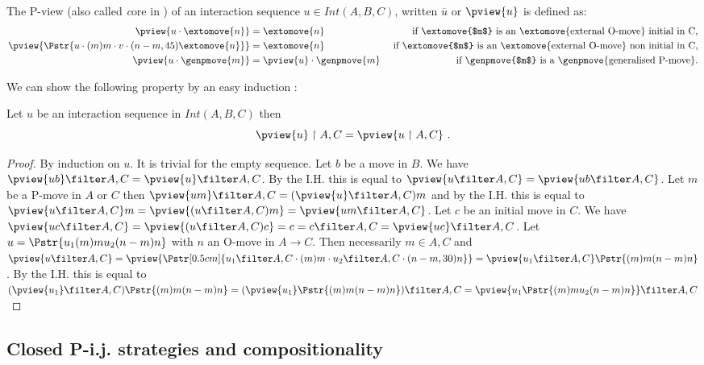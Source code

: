 The P-view (also called {\emph core} in \cite{McCusker-GamesandFullAbstrac}) of an interaction sequence $u \in Int(A,B,C)$, written $\overline{u}$ or $\pview{u}$ is defined as:
\begin{align*}
\pview{u\cdot \extomove{n}} &= \extomove{n} &
\mbox{ if \extomove{$m$} is an \extomove{external O-move} initial in C,}\\
\pview{\Pstr{u\cdot (m)m\cdot v \cdot (n-m,45){\extomove{n}} }} &= \extomove{n} &\mbox{ if \extomove{$m$} is an \extomove{external O-move} non initial in C,}\\
\pview{u \cdot \genpmove{m}} &= \pview{u}\cdot \genpmove{m}  & \mbox{ if \genpmove{$m$} is a \genpmove{generalised P-move}.}\\
\end{align*}

We can show the following property by an easy induction :
\begin{lemma}
\label{lem:pviewAC_eq_ACpview}
 Let $u$ be an interaction sequence in $Int(A,B,C)$ then
$$\pview{u} \upharpoonright A,C = \pview{u \upharpoonright A,C} \ .$$
\end{lemma}
\begin{proof}
  By induction on $u$. It is trivial for the empty sequence.
Let $b$ be a move in $B$. We have $\pview{u b} \filter A,C = \pview{u} \filter A,C$. By the I.H. this is equal to $\pview{u \filter A,C} = \pview{u b\filter A,C}$.
Let $m$ be a P-move in $A$ or $C$ then $\pview{u m} \filter A,C = (\pview{u} \filter A,C) m$ and by the I.H. this is
equal to $\pview{u \filter A,C} m = \pview{(u \filter A,C) m} = \pview{u m \filter A,C}$.
Let $c$ be an initial move in $C$. We have
$\pview{u c \filter A,C}  = \pview{(u \filter A,C) c} = c =  c \filter A,C = \pview{u c} \filter A,C$.
Let $u = \Pstr{u_1 (m){m} u_2 (n-m){n}}$ with $n$ an O-move in $A\rightarrow C$. Then necessarily $m\in A,C$ and
$ \pview{u\filter A,C} = \pview{\Pstr[0.5cm]{u_1\filter A,C \cdot (m){m} \cdot u_2\filter A,C \cdot (n-m,30){n}}} =
 \pview{u_1 \filter A,C} \Pstr{(m){m} (n-m){n}}$. By the I.H. this is equal to
$(\pview{u_1}\filter A,C) \Pstr{(m){m} (n-m){n}} =
(\pview{u_1} \Pstr{(m){m} (n-m){n}} ) \filter A,C  =
\pview{u_1 \Pstr{(m){m} u_2 (n-m){n}}} \filter A,C$
\end{proof}

\subsection{Closed P-i.j. strategies and compositionality}

